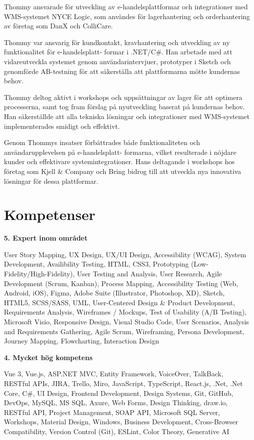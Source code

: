 \documentclass[a4paper,10pt]{article}
\begin{document}
Thommy ansvarade för utveckling av e-handelsplattformar och integrationer med WMS-systemet NYCE Logic, som användes för lagerhantering och orderhantering av företag som DanX och ColliCare.


Thommy var ansvarig för kundkontakt, kravhantering och utveckling av ny funktionalitet för e-handelsplatt-
formar i .NET/C\#. Han arbetade med att vidareutveckla systemet genom användarintervjuer, prototyper i Sketch och genomförde AB-testning för att säkerställa att plattformarna mötte kundernas behov.

Thommy deltog aktivt i workshops och uppsättningar av lager för att optimera processerna, samt tog fram förslag på nyutveckling baserat på kundernas behov. Han säkerställde att alla tekniska lösningar och integrationer med WMS-systemet implementerades smidigt och effektivt.

Genom Thommys insatser förbättrades både funktionaliteten och användarupplevelsen på e-handelsplatt-
formarna, vilket resulterade i nöjdare kunder och effektivare systemintegrationer. Hans deltagande i workshops hos företag som Kjell \& Company och Bring bidrog till att utveckla nya innovativa lösningar för dessa plattformar.

\vspace{0.5cm}

\section*{Kompetenser}

\textbf{5. Expert inom området}

User Story Mapping, UX Design, UX/UI Design, Accessibility (WCAG), System Development, Availibility Testing, HTML, CSS3, Prototyping (Low-Fidelity/High-Fidelity), User Testing and Analysis, User Research, Agile Development (Scrum, Kanban), Process Mapping, Accessibility Testing (Web, Android, iOS), Figma, Adobe Suite (Illustrator, Photoshop, XD), Sketch, HTML5, SCSS/SASS, UML, User-Centered Design \& Product Development, Requirements Analysis, Wireframes / Mockups, Test of Usability (A/B Testing), Microsoft Visio, Responsive Design, Visual Studio Code, User Scenarios, Analysis and Requirements Gathering, Agile Scrum, Wireframing, Persona Development, Journey Mapping, Flowcharting, Interaction Design
\vspace{0.3cm}

\textbf{4. Mycket hög kompetens}

Vue 3, Vue.js, ASP.NET MVC, Entity Framework, VoiceOver, TalkBack, RESTful APIs, JIRA, Trello, Miro, JavaScript, TypeScript, React.js, .Net, .Net Core, C\#, UI Design, Frontend Development, Design Systems, Git, GitHub, DevOps, MySQL, MS SQL, Axure, Web Forms, Design Thinking, draw.io, RESTful API, Project Management, SOAP API, Microsoft SQL Server, Workshops, Material Design, Windows, Business Development, Cross-Browser Compatibility, Version Control (Git), ESLint, Color Theory, Generative AI
\vspace{0.5cm}
\end{document}
